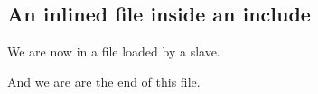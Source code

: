 \subsection {An inlined file inside an include}

We are now in a file loaded by a slave.

And we are are the end of this file.
